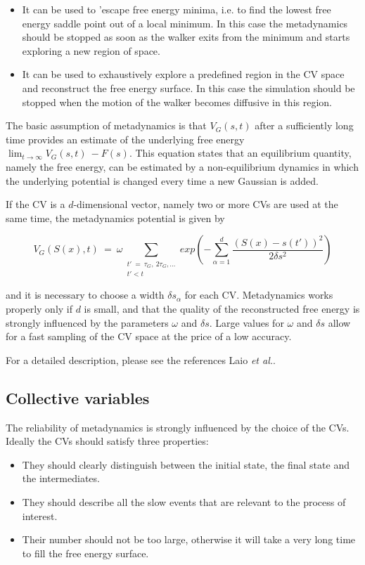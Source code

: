\documentclass[12pt,a4paper]{article}
\begin{document}
\begin{itemize}
\item It can be used to 'escape free energy minima, i.e. to find the lowest free energy saddle point out of a local minimum. In this case the metadynamics should be stopped as soon as the walker exits from the minimum and starts exploring a new region of space.
\item It can be used to exhaustively explore a predefined region in the CV space and reconstruct the free energy surface. In this case the simulation should be stopped when the motion of the walker becomes diffusive in this region.
\end{itemize}

The basic assumption of metadynamics is that $V_{G}(s, t)$ after a sufficiently long time provides an estimate of the underlying free energy $\lim_{t \to \infty} V_{G}(s, t) ~  -F(s)$. This equation states that an equilibrium quantity, namely the free energy, can be estimated by a non-equilibrium dynamics in which the underlying potential is changed every time a new Gaussian is added.

If the CV is a $d$-dimensional vector, namely two or more CVs are used at the same time, the metadynamics potential is given by

\begin{equation}
V_{G}(S(x), t) ~=~ \omega \sum_{\substack{t' ~= ~\tau_{G}, ~2\tau_{G},...\\t'<t}}exp(- \sum_{\alpha = 1}^{d} \frac{(S(x)-s(t'))^{2}}{2\delta s^{2}})
\label{EQ_vgd}
\end{equation}

and it is necessary to choose a width $\delta s_{\alpha}$ for each CV. Metadynamics works properly only if $d$ is small, and that the quality of the reconstructed free energy is strongly influenced by the parameters $\omega$ and $\delta s$. Large values for $\omega$ and $\delta s$ allow for a fast sampling of the CV space at the price of a low accuracy.

For a detailed description, please see the references Laio {\it et al.}\cite{Laio:2008wu, Laio:2002wm}.

\subsection{Collective variables}
The reliability of metadynamics is strongly influenced by the choice of the CVs. Ideally the CVs should satisfy three properties:

\begin{itemize}
\item They should clearly distinguish between the initial state, the final state and the intermediates.
\item They should describe all the slow events that are relevant to the process of interest.
\item Their number should not be too large, otherwise it will take a very long time to fill the free energy surface.
\end{itemize}
\end{document}
